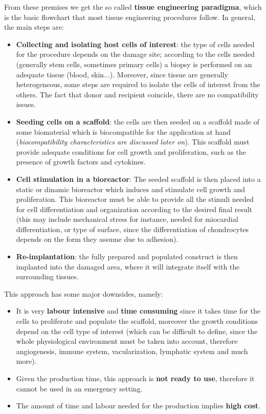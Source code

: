   From these premises we get the so called \textbf{tissue engineering paradigma}, which is the basic flowchart that most tissue engineering procedures follow. In general, the main steps are:
  \begin{itemize}
    \item \textbf{Collecting and isolating host cells of interest}: the type of cells needed for the procedure depends on the damage site; according to the cells needed (generally stem cells, sometimes primary cells) a biopsy is performed on an adequate tissue (blood, skin...). Moreover, since tissue are generally heterogeneous, some steps are required to isolate the cells of interest from the others. The fact that donor and recipient coincide, there are no compatibility issues.
    \item \textbf{Seeding cells on a scaffold}: the cells are then seeded on a scaffold made of some biomaterial which is biocompatible for the application at hand (\textit{biocompatibility characteristics are discussed later on}). This scaffold must provide adequate conditions for cell growth and proliferation, such as the presence of growth factors and cytokines.
    \item \textbf{Cell stimulation in a bioreactor}: The seeded scaffold is then placed into a static or dinamic bioreactor which induces and stimulate cell growth and proliferation. This bioreactor must be able to provide all the stimuli needed for cell differentiation and organization according to the desired final result (this may include mechanical stress for instance, needed for miocardial differentiation, or type of surface, since the differentiation of chondrocytes depends on the form they assume due to adhesion).
    \item \textbf{Re-implantation}: the fully prepared and populated construct is then implanted into the damaged area, where it will integrate itself with the surrounding tissues.
  \end{itemize}
  This approach has some major downsides, namely:
  \begin{itemize}
    \item It is very \textbf{labour intensive} and \textbf{time consuming} since it takes time for the cells to proliferate and populate the scaffold, moreover the growth conditions depend on the cell type of interest (which can be difficult to define, since the whole physiological environment must be taken into account, therefore angiogenesis, immune system, vacularization, lymphatic system and much more).
    \item Given the production time, this approach is \textbf{not ready to use}, therefore it cannot be used in an emergency setting.
    \item The amount of time and labour needed for the production implies \textbf{high cost}.
  \end{itemize}
